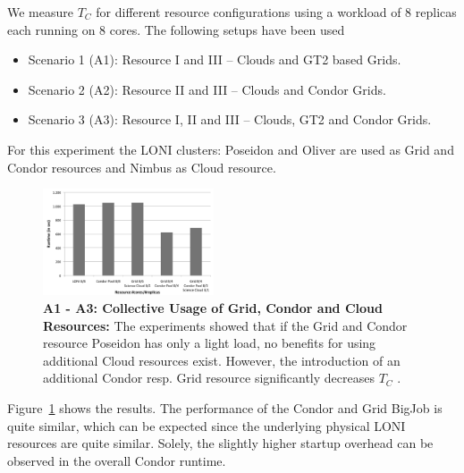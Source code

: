 \documentclass[conference,final]{IEEEtran}
\newcommand{\tc}{$T_{C}$ }
\begin{document}
We measure \tc for different resource configurations using a workload
of 8 replicas each running on 8 cores. The following setups have been used
\begin{itemize}
\item Scenario 1 (A1): Resource I and III -- Clouds and GT2 based Grids. 
\item Scenario 2 (A2): Resource II and III -- Clouds and Condor Grids.
\item Scenario 3 (A3): Resource I, II and III -- Clouds, GT2 and Condor Grids.
\end{itemize} 
For this experiment the LONI clusters: Poseidon and Oliver are used as Grid and Condor resources and
Nimbus as Cloud resource.

\begin{figure}[htbp]
    \centering
        \includegraphics[width=0.45\textwidth]{performance/8replica_scenario_grid_condor_cloud}
        \caption{\textbf{A1 - A3: Collective Usage of Grid, Condor and
            Cloud Resources: } The experiments showed that if the Grid
          and Condor resource Poseidon has only a light load, no
          benefits for using additional Cloud resources
          exist. However, the introduction of an additional Condor
          resp. Grid resource significantly decreases \tc.}
    \label{fig:performance_8replica_grid_cloud_condor}
\end{figure}

Figure~\ref{fig:performance_8replica_grid_cloud_condor} shows the results. 
The performance of the Condor and Grid BigJob is quite similar, which can be expected since the underlying 
physical LONI resources are quite similar. Solely, the slightly higher startup overhead can be observed in the overall Condor
runtime.
\end{document}
